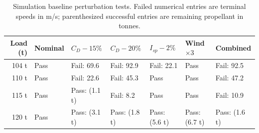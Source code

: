 \begin{table}[htbp]
\caption{Simulation baseline perturbation tests. Failed numerical entries are terminal speeds in m/s; parenthesized successful entries are remaining propellant in tonnes.}
\label{tab:src5}
\small
\setlength{\tabcolsep}{3.5pt}
\begin{tabularx}{\linewidth}{@{}rXXXXXX@{}}
\toprule
Load (t) & Nominal & $C_D-15\%$ & $C_D-20\%$ & $I_{sp}-2\%$ & Wind $\times3$ & Combined \\
\midrule
104 t & Pass & Fail: 69.6 & Fail: 92.9 & Fail: 22.1 & Pass & Fail: 92.5 \\
110 t & Pass & Fail: 22.6 & Fail: 45.3 & Pass & Pass & Fail: 47.2 \\
115 t & Pass & Pass: (1.1 t) & Fail: 8.2 & Pass & Pass & Fail: 10.9 \\
120 t & Pass & Pass: (3.1 t) & Pass: (1.8 t) & Pass: (5.6 t) & Pass: (6.7 t) & Pass: (1.6 t) \\
\bottomrule
\end{tabularx}
\end{table}
